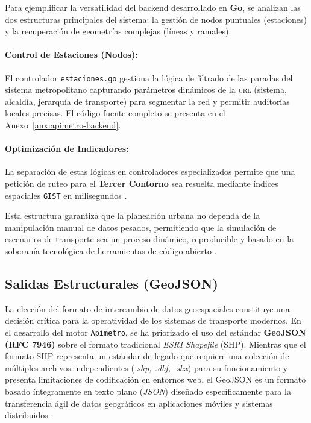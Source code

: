 Para ejemplificar la versatilidad del backend desarrollado en \textbf{Go}, se analizan las dos estructuras principales del sistema: la gestión de nodos puntuales (estaciones) y la recuperación de geometrías 
complejas (líneas y ramales).
\paragraph{Control de Estaciones (Nodos):} El controlador \texttt{estaciones.go} gestiona la lógica de filtrado de las paradas del sistema metropolitano capturando parámetros dinámicos de la \textsc{url} (sistema, alcaldía, jerarquía de transporte) para segmentar la red y permitir auditorías locales precisas. El código fuente completo se presenta en el Anexo~\ref{anx:apimetro-backend}.

\paragraph{Optimización de Indicadores:}
La separación de estas lógicas en controladores especializados permite que una petición de ruteo para el \textbf{Tercer Contorno} sea resuelta mediante índices espaciales \texttt{GIST} en milisegundos \parencite{cabrera2025apimetro}.

Esta estructura garantiza que la planeación urbana no dependa de la manipulación manual de datos pesados, permitiendo que la simulación de escenarios de transporte sea un proceso dinámico, 
reproducible y basado en la soberanía tecnológica de herramientas de código abierto \parencite{cabrera2025apimetro}.


\subsection{Salidas Estructurales (GeoJSON)}
\label{subsec:estructura-geojson}

La elección del formato de intercambio de datos geoespaciales constituye una decisión crítica para la operatividad de los sistemas de transporte modernos. En el desarrollo del motor \texttt{Apimetro}, se ha priorizado
 el uso del estándar \textbf{GeoJSON (RFC 7946)} sobre el formato tradicional \textit{ESRI Shapefile} (SHP). Mientras que el formato SHP representa un estándar de legado que requiere una colección de múltiples archivos 
independientes (\textit{.shp, .dbf, .shx}) para su funcionamiento y presenta limitaciones de codificación en entornos web, el GeoJSON es un formato basado íntegramente en texto plano (\textit{JSON}) diseñado 
específicamente para la transferencia ágil de datos geográficos en aplicaciones móviles y sistemas distribuidos \parencite{cabrera2025apimetro}.

